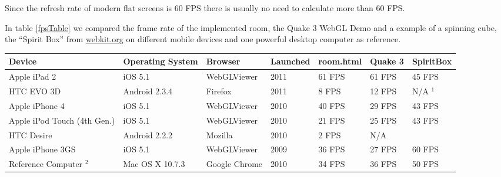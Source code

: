 \documentclass[12pt,journal,compsoc]{IEEEtran}
\begin{document}
Since the refresh rate of modern flat screens is 60 FPS there is usually no need to calculate more than 60 FPS. %

In table \ref{fpsTable} we compared the frame rate of the implemented room, the Quake 3 WebGL Demo \cite{quakewebgl} and a example of a spinning cube, the “Spirit Box” from \url {webkit.org} on different mobile devices and one powerful desktop computer as reference.

\begin{table*}[tb]
	\begin{centering}
	\begin{tabular}{l|l|l|l|l|l|l}
		\textbf{Device}						& \textbf{Operating System}	& \textbf{Browser}		& \textbf{Launched}	& \textbf{room.html}	& \textbf{Quake 3}	&	\textbf{SpiritBox}	\\
		\hline
		Apple iPad 2				& iOS 5.1			& WebGLViewer	& 2011		& 61 FPS	& 61 FPS	& 45 FPS		\\ 
		HTC EVO 3D					& Android 2.3.4		& Firefox		& 2011		& 8 FPS		& 12 FPS	& N/A $^{1}$	\\ 
		Apple iPhone 4				& iOS 5.1			& WebGLViewer	& 2010		& 40 FPS	& 29 FPS	& 43 FPS		\\
		Apple iPod Touch (4th Gen.)	& iOS 5.1			& WebGLViewer	& 2010		& 21 FPS	& 25 FPS	& 43 FPS		\\ 
		HTC Desire					& Android 2.2.2		& Mozilla		& 2010		& 2 FPS 	& N/A		&				\\ %
		Apple iPhone 3GS			& iOS 5.1			& WebGLViewer	& 2009		&	36 FPS		&	27 FPS	&	60 FPS			\\
		\hline
		Reference Computer $^{2}$			& 	Mac OS X 10.7.3			& 	Google Chrome	&	2010	&	34 FPS	&	36 FPS	&		50 FPS	\\
	\end{tabular}
	\caption{Frames per Second (FPS) of different WebGL applications on different devices\label{fpsTable}
	\\$^{1}$ \textit{The FPS value is constantly alternating between values in the range from 10 FPS up to over 200 FPS, making it impossible to determine a realistic value.}
	\\$^{2}$ \textit{Reference Computer: MacBook 2010, Mac OS X 10.7.3, 2.26 GHz Intel Core 2 Duo, 4 GB 1067 MHz DDR3 RAM}}
	\end{centering}
\end{table*}
\end{document}
